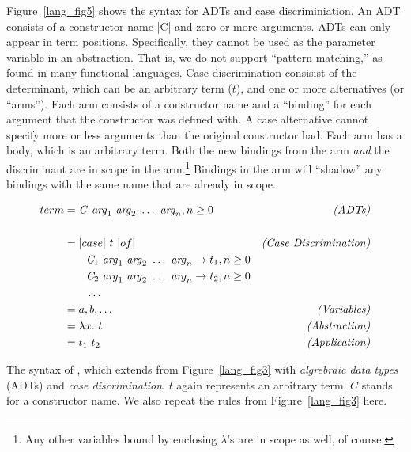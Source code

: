 \documentclass[12pt]{report}
\begin{document}
Figure~\ref{lang_fig5} shows the syntax for ADTs and case
discriminiation. An ADT consists of a constructor name |C| and zero or
more arguments. ADTs can only appear in term positions. Specifically,
they cannot be used as the parameter variable in an abstraction. That
is, we do not support ``pattern-matching,'' as found in many
functional languages. Case discrimination consisist of the
determinant, which can be an arbitrary term ($t$), and one or more
alternatives (or ``arms''). Each arm consists of a constructor name
and a ``binding'' for each argument that the constructor was defined
with. A case alternative cannot specify more or less arguments than
the original constructor had. Each arm has a body, which is an
arbitrary term. Both the new bindings from the arm \emph{and} the
discriminant are in scope in the arm.\footnote{Any other variables
  bound by enclosing $\lambda$'s are in scope as well, of course.}
Bindings in the arm will ``shadow'' any bindings with the same name
that are already in scope.

\begin{myfig}[tbh]
  \begin{minipage}{3in}
  \begin{align*}
    term &= \mathit{C}\ \mathit{arg}_1\ \mathit{arg}_2\ \ldots\ \mathit{arg}_n, n \ge 0 & \hfil\text{\emph{(ADTs)}} \\ \\
      &= |case|\ t\ |of| & \hfil\text{\emph{(Case Discrimination)}} \\
      & \qquad\mathit{C}_1\ \mathit{arg}_1\ \mathit{arg}_2\ \ldots\ \mathit{arg}_n \rightarrow t_1, n \ge 0 \\
      & \qquad\mathit{C}_2\ \mathit{arg}_1\ \mathit{arg}_2\ \ldots\ \mathit{arg}_n \rightarrow t_2, n \ge 0 \\
      & \qquad\ldots \\
      &= a, b, \ldots & \hfill\text{\emph{(Variables)}} \\
      &= \lamAbs{x}{t} & \hfill\text{\emph{(Abstraction)}} \\ 
      &= \lamApp{t_1}{t_2} & \hfill\text{\emph{(Application)}}  \end{align*}
  \end{minipage}
  \caption{The syntax of \lamC, which extends \lamA from
    Figure~\ref{lang_fig3} with \emph{algrebraic data types} (ADTs)
    and \emph{case discrimination}. $t$ again represents an arbitrary
    term. $C$ stands for a constructor name. We also repeat the rules
    from Figure~\ref{lang_fig3} here.}
  \label{lang_fig5}
\end{myfig}
\end{document}
